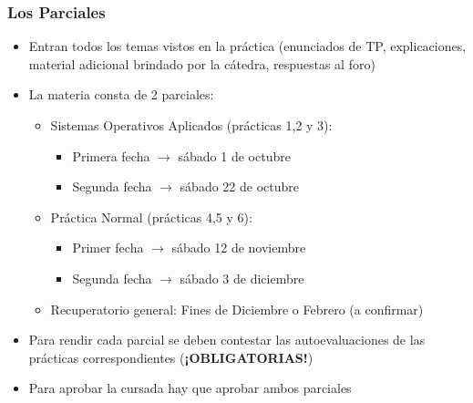 \begin{frame}
	\frametitle{Los Parciales}
	\begin{itemize}
		\item Entran todos los temas vistos en la práctica (enunciados de TP, explicaciones, material adicional brindado por la cátedra, respuestas al foro)
		\item La materia consta de 2 parciales:
		\begin{itemize}
			\item Sistemas Operativos Aplicados (prácticas 1,2 y 3):
			\begin{itemize}
				\item Primera fecha $\rightarrow$ sábado 1 de octubre
				\item Segunda fecha $\rightarrow$ sábado 22 de octubre
			\end{itemize}
			\item Práctica Normal (prácticas 4,5 y 6):
			\begin{itemize}
				\item Primer fecha $\rightarrow$ sábado 12 de noviembre
				\item Segunda fecha $\rightarrow$ sábado 3 de diciembre
			\end{itemize}
			\item Recuperatorio general: Fines de Diciembre o Febrero (a confirmar)
		\end{itemize}
		\item Para rendir cada parcial se deben contestar las autoevaluaciones de las prácticas correspondientes (\textbf{¡OBLIGATORIAS!})
		\item Para aprobar la cursada hay que aprobar ambos parciales
	\end{itemize}
\end{frame}
